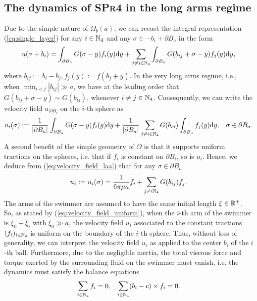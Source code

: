 \subsection{The dynamics of \textsc{SPr4} in the long arms regime}

Due to the simple nature of $\Omega_b(a)$, we can recast the integral representation (\ref{eq:single_layer}) for any $i \in \mathbb{N}_4$ and any $\sigma \in -b_i + \partial B_a$ in the form
\begin{align}
	u(\sigma + b_i) = \int_{\partial B_a} G(\sigma - y)f_i(y) \mathrm{d}y + \sum_{j \neq i \in \mathbb{N}_4} \int_{\partial B_a} G(b_{ij} + \sigma - y) f_j(y) \mathrm{d}y,
\end{align}
where $b_{ij} := b_i - b_j, f_j(y) := f(b_j + y)$. In the very long arms regime, i.e., when $\min_{i < j} |b_{ij}| \gg a$, we have at the leading order that $G(b_{ij} + \sigma - y) \sim G(b_{ij})$, whenever $i \neq j \in \mathbb{N}_4$. Consequently, we can write the velocity field $u_{\mid \partial B_i}$ on the $i$-th sphere as
\begin{align}
\label{eq:velocity_field_laa}
	u_i(\sigma) := \frac{1}{|\partial B_a|} \int_{\partial B_a} G(\sigma - y) f_i(y) \mathrm{d}y + \frac{1}{|\partial B_a|} \sum_{j \neq i \in \mathbb{N}_4} G(b_{ij}) \int_{\partial B_a} f_j(y) \mathrm{d}y, & & \sigma \in \partial B_a.
\end{align}
A second benefit of the simple geometry of $\Omega$ is that it supports uniform tractions on the spheres, i.e. that if $f_i$ is constant on $\partial B_i$, so is $u_i$. Hence, we deduce from (\ref{eq:velocity_field_laa}) that for any $\sigma \in \partial B_a$
\begin{align}
\label{eq:velocity_field_uniform}
	u_i := u_i(\sigma) = \frac{1}{6 \pi \mu a} f_i + \sum_{j \neq i \mathbb{N}_4} G(b_{ij}) f_j.
\end{align}
The arms of the swimmer are assumed to have the same initial length $\xi \in \mathbb{R}^+$. So, as stated by (\ref{eq:velocity_field_uniform}), when the $i$-th arm of the swimmer is $\xi_0 + \xi_i$ with $\xi_0 \gg a$, the velocity field $u_i$ associated to the constant tractions $(f_i)_{i \in \mathbb{N}_4}$ is uniform on the boundary of the $i$-th sphere. Thus, without loss of generality, we can interpret the velocity field $u_i$ as applied to the center $b_i$ of the $i$-th ball. Furthermore, due to the negligible inertia, the total viscous force and torque exerted by the surrounding fluid on the swimmer must vanish, i.e. the dynamics must satisfy the balance equations
\begin{eqnarray}
\label{eq:balance_equations}
	\sum_{i \in \mathbb{N}_4} f_i = 0, & & \sum_{i \in \mathbb{N}_4} (b_i - c) \times f_i = 0.
\end{eqnarray}
